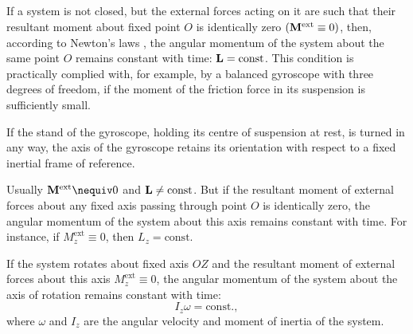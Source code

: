 \subsection{}\label{4.4.3} If a system is not closed, but the external forces acting on it are such that their resultant moment about fixed point $O$ is identically zero $ (\vb{M}^{\textrm{ext}} \equiv 0)$, then, according to Newton's laws , the angular momentum of the system about the same point $O$ remains constant with time: $\vb{L} = \textrm{const}$. This condition is practically complied with, for example, by a bal­anced gyroscope  with three degrees of freedom, if the moment of the friction force in its suspension is sufficiently small.

If the stand of the gyroscope, holding its centre of suspension at rest, is turned in any way, the axis of the gyroscope retains its orientation with respect to a fixed inertial frame of reference.

Usually $\vb{M}^{\textrm{ext}} \nequiv 0$ and $\vb{L} \neq \textrm{const}$. But if the resultant moment of external forces about any fixed axis passing through point $O$ is identically zero, the angular momentum of the system about
this axis remains constant with time. For instance, if $M^{\textrm{ext}}_{z}\equiv 0$, then $L_{z} = \textrm{const}$.

If the system rotates about fixed axis $OZ$ and the resultant moment of external forces about this axis $M^{\textrm{ext}}_{z} \equiv 0$, the angular momentum of the system about the axis of rotation remains constant with time:
\begin{equation*}%
I_{z} \omega = \textrm{const.},
\end{equation*}
where $\omega$ and $I_{z}$ are the angular velocity and moment of inertia of the system.

